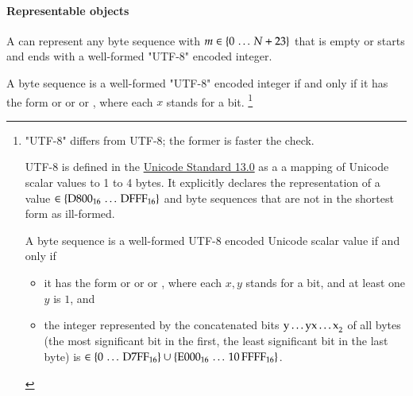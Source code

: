 \paragraph{Representable objects}

A  can represent any byte sequence 
with $m \in \{0 \,\ldots\, N + 23\}$ that is empty or starts and ends with a well-formed "UTF-8" encoded integer.

A byte sequence  is a well-formed "UTF-8" encoded integer if and only if
it has the form
 or
 or
 or
,
where each $x$ stands for a bit.%
\footnote{
    "UTF-8" differs from UTF-8; the former is faster the check.

    UTF-8 is defined in the
    \href{https://www.unicode.org/versions/Unicode13.0.0/ch03.pdf\#G31703}{Unicode Standard 13.0}
    as a a mapping of Unicode scalar values to 1 to 4 bytes.
    It explicitly declares the representation of a value $\in \{\mathrm{D800}_{16} \,\ldots\, \mathrm{DFFF}_{16}\}$
    and byte sequences that are not in the shortest form as ill-formed.

    A byte sequence  is a well-formed UTF-8 encoded Unicode scalar value if and
    only if
    \begin{itemize}
        \item
        it has the form
         or
         or
         or
        ,
        where each $x, y$ stands for a bit, and at least one $y$ is $1$, and

        \item
        the integer represented by the concatenated bits $\mathrm{y \ldots y x \ldots x}_{2}$ of all bytes
        (the most significant bit in the first, the least significant bit in the last byte) is
        $\in \{0 \,\ldots\, \mathrm{D7FF}_{16}\} \cup \{\mathrm{E000}_{16} \,\ldots\, \mathrm{10\,FFFF}_{16}\}$.
    \end{itemize}
}

